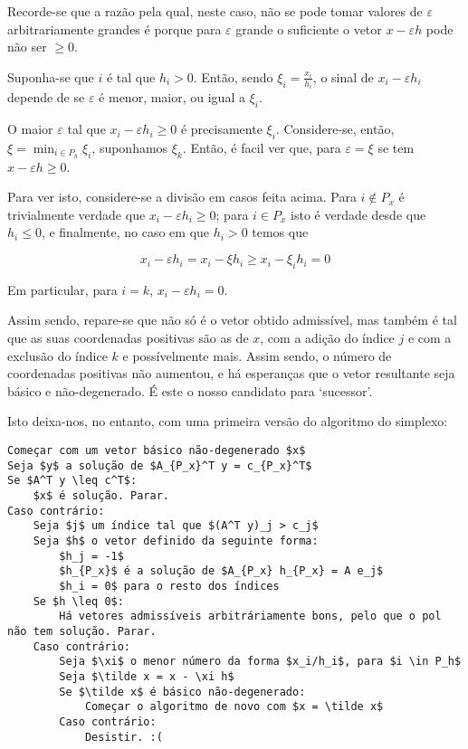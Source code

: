 \documentclass{article}
\theoremstyle{definition}
\begin{document}
	Recorde-se que a razão pela qual, neste caso, não se pode tomar valores de $\varepsilon$ arbitrariamente grandes é porque para $\varepsilon$ grande o suficiente o vetor $x - \varepsilon h$ pode não ser $\geq 0$.
	
	Suponha-se que $i$ é tal que $h_i > 0$. Então, sendo $\xi_i = \frac{x_i}{h_i}$, o sinal de $x_i - \varepsilon h_i$ depende de se $\varepsilon$ é menor, maior, ou igual a $\xi_i$.
	
	O maior $\varepsilon$ tal que $x_i - \varepsilon h_i \geq 0$ é precisamente $\xi_i$. Considere-se, então, $\xi = \min_{i \in P_h} \xi_i$, suponhamos $\xi_k$. Então, é facil ver que, para $\varepsilon = \xi$ se tem $x - \varepsilon h \geq 0$.
	
	Para ver isto, considere-se a divisão em casos feita acima. Para $i \not \in P_x$ é trivialmente verdade que $x_i - \varepsilon h_i \geq 0$; para $i \in P_x$ isto é verdade desde que $h_i \leq 0$, e finalmente, no caso em que $h_i > 0$ temos que
	
	\[x_i - \varepsilon h_i = x_i - \xi h_i \geq x_i - \xi_i h_i = 0\]
	
	Em particular, para $i = k$, $x_i - \varepsilon h_i = 0$.
	
	Assim sendo, repare-se que não só é o vetor obtido admissível, mas também é tal que as suas coordenadas positivas são as de $x$, com a adição do índice $j$ e com a exclusão do índice $k$ e possívelmente mais. Assim sendo, o número de coordenadas positivas não aumentou, e há esperanças que o vetor resultante seja básico e não-degenerado. É este o nosso candidato para `sucessor'.
	
	Isto deixa-nos, no entanto, com uma primeira versão do algoritmo do simplexo:
	
	\begin{lstlisting}
Começar com um vetor básico não-degenerado $x$
Seja $y$ a solução de $A_{P_x}^T y = c_{P_x}^T$
Se $A^T y \leq c^T$:
	$x$ é solução. Parar.
Caso contrário:
	Seja $j$ um índice tal que $(A^T y)_j > c_j$
	Seja $h$ o vetor definido da seguinte forma:
		$h_j = -1$
		$h_{P_x}$ é a solução de $A_{P_x} h_{P_x} = A e_j$
		$h_i = 0$ para o resto dos índices
	Se $h \leq 0$:
		Há vetores admissíveis arbitráriamente bons, pelo que o pol não tem solução. Parar.
	Caso contrário:
		Seja $\xi$ o menor número da forma $x_i/h_i$, para $i \in P_h$
		Seja $\tilde x = x - \xi h$
		Se $\tilde x$ é básico não-degenerado:
			Começar o algoritmo de novo com $x = \tilde x$
		Caso contrário:
			Desistir. :(
	\end{lstlisting}
	
\end{document}

